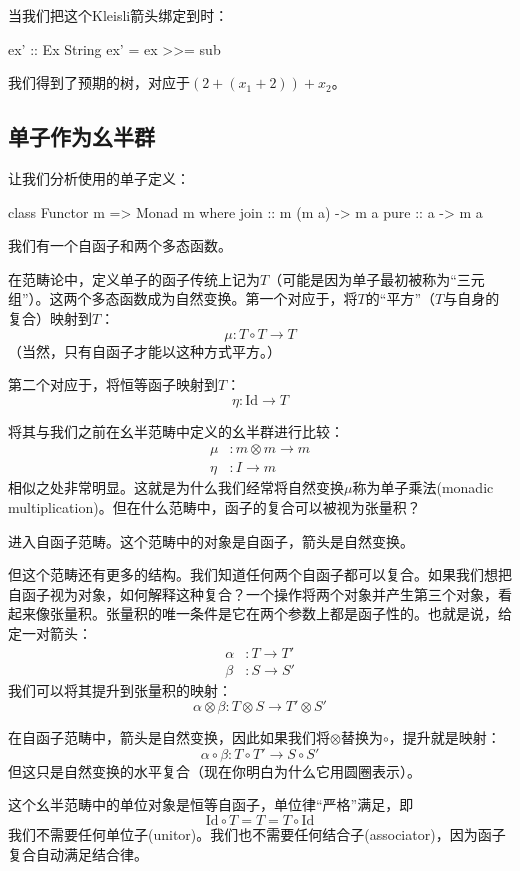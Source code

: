 \documentclass[DaoFP]{subfiles}
\begin{document}
当我们把这个Kleisli箭头绑定到时：
\begin{haskell}
ex' :: Ex String
ex' = ex >>= sub
\end{haskell}
我们得到了预期的树，对应于$(2 + (x_1 + 2)) + x_2$。

\subsection{单子作为幺半群}

让我们分析使用的单子定义：
\begin{haskell}
class Functor m => Monad m where
  join :: m (m a) -> m a
  pure :: a -> m a
\end{haskell}
我们有一个自函子和两个多态函数。

在范畴论中，定义单子的函子传统上记为$T$（可能是因为单子最初被称为“三元组”）。这两个多态函数成为自然变换。第一个对应于，将$T$的“平方”（$T$与自身的复合）映射到$T$：
\[ \mu \colon T \circ T \to T \]
（当然，只有自函子才能以这种方式平方。）

第二个对应于，将恒等函子映射到$T$：
\[ \eta \colon \text{Id} \to T \]

将其与我们之前在幺半范畴中定义的幺半群进行比较：
\begin{align*}
\mu &\colon m \otimes m \to m \\
\eta &\colon I \to m
\end{align*}
相似之处非常明显。这就是为什么我们经常将自然变换$\mu$称为单子乘法(monadic multiplication)。但在什么范畴中，函子的复合可以被视为张量积？

进入自函子范畴。这个范畴中的对象是自函子，箭头是自然变换。

但这个范畴还有更多的结构。我们知道任何两个自函子都可以复合。如果我们想把自函子视为对象，如何解释这种复合？一个操作将两个对象并产生第三个对象，看起来像张量积。张量积的唯一条件是它在两个参数上都是函子性的。也就是说，给定一对箭头：
\begin{align*}
 \alpha &\colon T \to T' \\
 \beta &\colon S \to S' 
\end{align*}
我们可以将其提升到张量积的映射：
\[ \alpha \otimes \beta \colon T \otimes S \to T' \otimes S' \]

在自函子范畴中，箭头是自然变换，因此如果我们将$\otimes$替换为$\circ$，提升就是映射：
\[ \alpha \circ \beta \colon T \circ T' \to S \circ S' \]
但这只是自然变换的水平复合（现在你明白为什么它用圆圈表示）。

这个幺半范畴中的单位对象是恒等自函子，单位律“严格”满足，即
\[ \text{Id} \circ T = T = T \circ \text{Id}\]
我们不需要任何单位子(unitor)。我们也不需要任何结合子(associator)，因为函子复合自动满足结合律。
\end{document}
